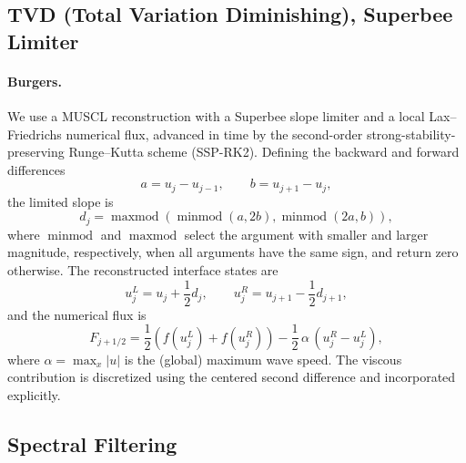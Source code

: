 \documentclass[letterpaper]{article} %
\begin{document}
\subsection{TVD (Total Variation Diminishing), Superbee Limiter}
\label{app:tvd}

\paragraph{Burgers.}
We use a MUSCL reconstruction with a Superbee slope limiter and a local
Lax--Friedrichs numerical flux, advanced in time by the second-order
strong-stability-preserving Runge--Kutta scheme (SSP-RK2). Defining the
backward and forward differences
\[
a=u_j-u_{j-1},
\qquad
b=u_{j+1}-u_j,
\]
the limited slope is
\[
d_j=
\operatorname{maxmod}
\left(
\operatorname{minmod}(a,2b),
\operatorname{minmod}(2a,b)
\right),
\]
where $\operatorname{minmod}$ and $\operatorname{maxmod}$ select the argument
with smaller and larger magnitude, respectively, when all arguments have the
same sign, and return zero otherwise. The reconstructed interface states are
\[
u^L_j=u_j+\frac12d_j,
\qquad
u^R_j=u_{j+1}-\frac12d_{j+1},
\]
and the numerical flux is
\[
F_{j+1/2}
=
\frac12
\left(
f(u^L_j)+f(u^R_j)
\right)
-\frac12\,\alpha\,(u^R_j-u^L_j),
\]
where $\alpha=\max_x|u|$ is the (global) maximum wave speed. The viscous
contribution is discretized using the centered second difference and
incorporated explicitly.




\subsection{Spectral Filtering}
\label{app:spectral}
\end{document}
